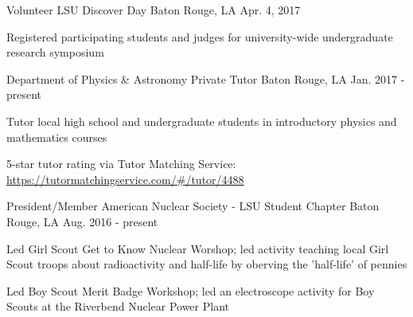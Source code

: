 \begin{cventries}
  \cventry
    {Volunteer} %
    {LSU Discover Day} %
    {Baton Rouge, LA} %
    {Apr. 4, 2017} %
    {
    \begin{cvitems} %
      \item {Registered participating students and judges for university-wide undergraduate research symposium}
    \end{cvitems}
    }
    {}
\end{cventries}
\begin{cventries}
  \cventry
    {Department of Physics \& Astronomy} %
    {Private Tutor} %
    {Baton Rouge, LA} %
    {Jan. 2017 - present} %
    {
    \begin{cvitems} %
      \item {Tutor local high school and undergraduate students in introductory physics and mathematics courses}
      \item {5-star tutor rating via Tutor Matching Service: \url{https://tutormatchingservice.com/#/tutor/4488}}
    \end{cvitems}
    }
    {}
\end{cventries}
\begin{cventries}
  \cventry
    {President/Member} %
    {American Nuclear Society - LSU Student Chapter} %
    {Baton Rouge, LA} %
    {Aug. 2016 - present} %
    {
    \begin{cvitems} %
      \item {Led Girl Scout Get to Know Nuclear Worshop; led activity teaching local Girl Scout troops about radioactivity and half-life by oberving the 'half-life' of pennies}
      \item {Led Boy Scout Merit Badge Workshop; led an electroscope activity for Boy Scouts at the Riverbend Nuclear Power Plant}
    \end{cvitems}
    }
    {}
\end{cventries}
